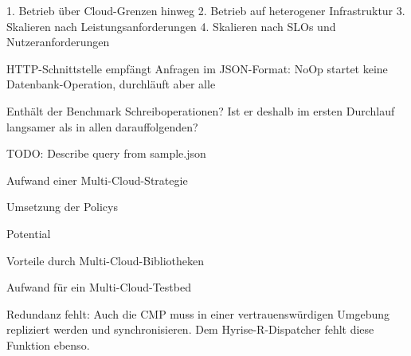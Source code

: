 1. Betrieb über Cloud-Grenzen hinweg
2. Betrieb auf heterogener Infrastruktur
3. Skalieren nach Leistungsanforderungen
4. Skalieren nach SLOs und Nutzeranforderungen

HTTP-Schnittstelle empfängt Anfragen im JSON-Format: NoOp startet keine Datenbank-Operation, durchläuft aber alle 

Enthält der Benchmark Schreiboperationen? Ist er deshalb im ersten Durchlauf langsamer als in allen darauffolgenden?

TODO: Describe query from sample.json





Aufwand einer Multi-Cloud-Strategie

Umsetzung der Policys

Potential

Vorteile durch Multi-Cloud-Bibliotheken

Aufwand für ein Multi-Cloud-Testbed

Redundanz fehlt: Auch die CMP muss in einer vertrauenswürdigen Umgebung repliziert werden und synchronisieren. Dem Hyrise-R-Dispatcher fehlt diese Funktion ebenso.